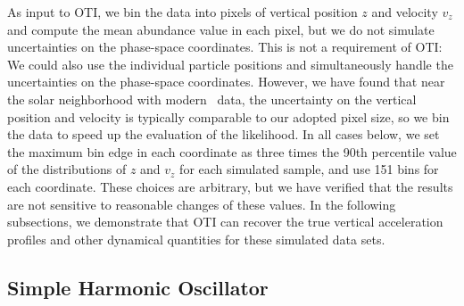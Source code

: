 As input to OTI, we bin the data into pixels of vertical position $z$ and velocity $v_z$
and compute the mean abundance value in each pixel, but we do not simulate uncertainties
on the phase-space coordinates.
This is not a requirement of OTI: We could also use the individual particle positions
and simultaneously handle the uncertainties on the phase-space coordinates.
However, we have found that near the solar neighborhood with modern \gaia\ data, the
uncertainty on the vertical position and velocity is typically comparable to our adopted
pixel size, so we bin the data to speed up the evaluation of the likelihood.
In all cases below, we set the maximum bin edge in each coordinate as three times the
90th percentile value of the distributions of $z$ and $v_z$ for each simulated sample,
and use 151 bins for each coordinate.
These choices are arbitrary, but we have verified that the results are not sensitive to
reasonable changes of these values.
In the following subsections, we demonstrate that OTI can recover the true vertical
acceleration profiles and other dynamical quantities for these simulated data sets.


\subsection{Simple Harmonic Oscillator}
\label{sec:sim-sho}

